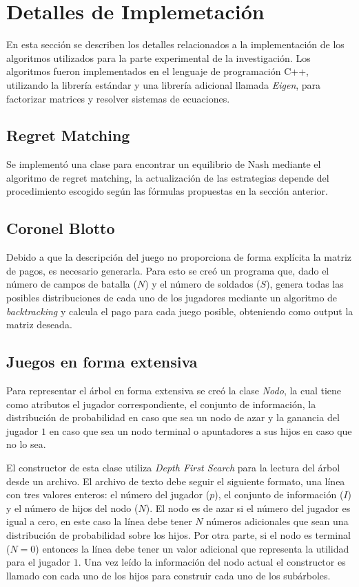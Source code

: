 \section{Detalles de Implemetación}
En esta sección se describen los detalles relacionados a la implementación de los algoritmos utilizados para la parte experimental de la investigación. Los algoritmos fueron implementados en el lenguaje de programación C++, utilizando la librería estándar y una librería adicional llamada \textit{Eigen}, para factorizar matrices y resolver sistemas de ecuaciones.

\subsection{Regret Matching}
Se implementó una clase para encontrar un equilibrio de Nash mediante el algoritmo de regret matching, la actualización de las estrategias depende del procedimiento escogido según las fórmulas propuestas en la sección anterior.

\subsection{Coronel Blotto}
Debido a que la descripción del juego no proporciona de forma explícita la matriz de pagos, es necesario generarla. Para esto se creó un programa que, dado el número de campos de batalla ($N$) y el número de soldados ($S$), genera todas las posibles distribuciones de cada uno de los jugadores mediante un algoritmo de \textit{backtracking} y calcula el pago para cada juego posible, obteniendo como output la matriz deseada.

\subsection{Juegos en forma extensiva}
Para representar el árbol en forma extensiva se creó la clase \textit{Nodo}, la cual tiene como atributos el jugador correspondiente, el conjunto de información, la distribución de probabilidad en caso que sea un nodo de azar y la ganancia del jugador $1$ en caso que sea un nodo terminal o apuntadores a sus hijos en caso que no lo sea.

El constructor de esta clase utiliza \textit{Depth First Search} para la lectura del árbol desde un archivo. El archivo de texto debe seguir el siguiente formato, una línea con tres valores enteros: el número del jugador ($p$), el conjunto de información ($I$) y el número de hijos del nodo ($N$). El nodo es de azar si el número del jugador es igual a cero, en este caso la línea debe tener $N$ números adicionales que sean una distribución de probabilidad sobre los hijos. Por otra parte, si el nodo es terminal ($N = 0$) entonces la línea debe tener un valor adicional que representa la utilidad para el jugador $1$. Una vez leído la información del nodo actual el constructor es llamado con cada uno de los hijos para construir cada uno de los subárboles.

